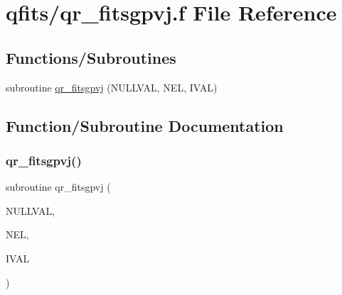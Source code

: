 \hypertarget{qr__fitsgpvj_8f}{}\section{qfits/qr\+\_\+fitsgpvj.f File Reference}
\label{qr__fitsgpvj_8f}
\subsection*{Functions/\+Subroutines}
\begin{DoxyCompactItemize}
\item 
subroutine \hyperlink{qr__fitsgpvj_8f_af479fa6b4c3d9829eae50407a7c37dee}{qr\+\_\+fitsgpvj} (N\+U\+L\+L\+V\+AL, N\+EL, I\+V\+AL)
\end{DoxyCompactItemize}


\subsection{Function/\+Subroutine Documentation}
\mbox{\label{qr__fitsgpvj_8f_af479fa6b4c3d9829eae50407a7c37dee}} 
\subsubsection{\texorpdfstring{qr\+\_\+fitsgpvj()}{qr\_fitsgpvj()}}
{\footnotesize\ttfamily subroutine qr\+\_\+fitsgpvj (\begin{DoxyParamCaption}\item[{integer}]{N\+U\+L\+L\+V\+AL,  }\item[{integer}]{N\+EL,  }\item[{integer, dimension(nel)}]{I\+V\+AL }\end{DoxyParamCaption})}

